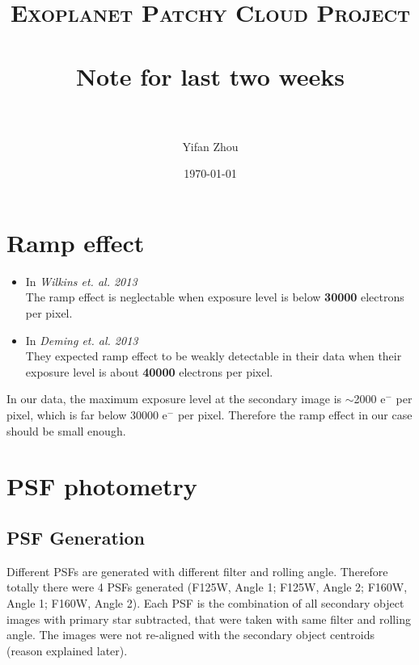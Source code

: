 \documentclass[paper=letter, fontsize=11pt]{scrartcl} %
\title{ 
\normalfont \normalsize 
\textsc{Exoplanet Patchy Cloud Project} \\ [25pt] %
\horrule{0.5pt} \\[0.4cm] %
\huge Note for last two weeks\\ %
\horrule{2pt} \\[0.5cm] %
}
\author{Yifan Zhou} %
\date{\normalsize\today} %
\numberwithin{equation}{section} %
\numberwithin{figure}{section} %
\numberwithin{table}{section} %
\begin{document}
\maketitle %
\section{Ramp effect}

\begin{itemize}
\item  In \textsl{Wilkins et. al. 2013}\\
    The ramp effect is neglectable when exposure level is below \textbf{30000} electrons per pixel.
\item In \textsl{Deming et. al. 2013}\\
    They expected ramp effect to be weakly detectable in their data
    when their exposure level is about \textbf{40000} electrons per pixel.
\end{itemize}

 In our data, the maximum exposure level at the secondary image is $\sim$2000 e$^-$ per pixel, which is far below 30000 e$^-$ per pixel. Therefore the ramp effect in our case should be small enough.

 \section{ PSF photometry}

 \subsection{PSF Generation}
Different PSFs are generated with different filter and rolling
angle. Therefore totally there were 4 PSFs generated (F125W, Angle 1;
F125W, Angle 2; F160W, Angle 1; F160W, Angle 2). Each PSF is the
combination of all secondary object images with primary star
subtracted, that were taken with same
filter and rolling angle. The images were not re-aligned with the
secondary object centroids (reason explained later).\par
\end{document}
